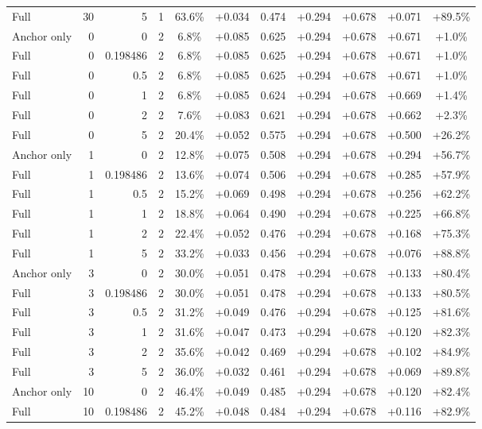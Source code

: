 \begin{table}[htbp]
\begin{tabular}{lrrrccccccc}
Full & 30 & 5 & 1 & 63.6\% & +0.034 & 0.474 & +0.294 & +0.678 & +0.071 & +89.5\% \\
Anchor only & 0 & 0 & 2 & 6.8\% & +0.085 & 0.625 & +0.294 & +0.678 & +0.671 & +1.0\% \\
Full & 0 & 0.198486 & 2 & 6.8\% & +0.085 & 0.625 & +0.294 & +0.678 & +0.671 & +1.0\% \\
Full & 0 & 0.5 & 2 & 6.8\% & +0.085 & 0.625 & +0.294 & +0.678 & +0.671 & +1.0\% \\
Full & 0 & 1 & 2 & 6.8\% & +0.085 & 0.624 & +0.294 & +0.678 & +0.669 & +1.4\% \\
Full & 0 & 2 & 2 & 7.6\% & +0.083 & 0.621 & +0.294 & +0.678 & +0.662 & +2.3\% \\
Full & 0 & 5 & 2 & 20.4\% & +0.052 & 0.575 & +0.294 & +0.678 & +0.500 & +26.2\% \\
Anchor only & 1 & 0 & 2 & 12.8\% & +0.075 & 0.508 & +0.294 & +0.678 & +0.294 & +56.7\% \\
Full & 1 & 0.198486 & 2 & 13.6\% & +0.074 & 0.506 & +0.294 & +0.678 & +0.285 & +57.9\% \\
Full & 1 & 0.5 & 2 & 15.2\% & +0.069 & 0.498 & +0.294 & +0.678 & +0.256 & +62.2\% \\
Full & 1 & 1 & 2 & 18.8\% & +0.064 & 0.490 & +0.294 & +0.678 & +0.225 & +66.8\% \\
Full & 1 & 2 & 2 & 22.4\% & +0.052 & 0.476 & +0.294 & +0.678 & +0.168 & +75.3\% \\
Full & 1 & 5 & 2 & 33.2\% & +0.033 & 0.456 & +0.294 & +0.678 & +0.076 & +88.8\% \\
Anchor only & 3 & 0 & 2 & 30.0\% & +0.051 & 0.478 & +0.294 & +0.678 & +0.133 & +80.4\% \\
Full & 3 & 0.198486 & 2 & 30.0\% & +0.051 & 0.478 & +0.294 & +0.678 & +0.133 & +80.5\% \\
Full & 3 & 0.5 & 2 & 31.2\% & +0.049 & 0.476 & +0.294 & +0.678 & +0.125 & +81.6\% \\
Full & 3 & 1 & 2 & 31.6\% & +0.047 & 0.473 & +0.294 & +0.678 & +0.120 & +82.3\% \\
Full & 3 & 2 & 2 & 35.6\% & +0.042 & 0.469 & +0.294 & +0.678 & +0.102 & +84.9\% \\
Full & 3 & 5 & 2 & 36.0\% & +0.032 & 0.461 & +0.294 & +0.678 & +0.069 & +89.8\% \\
Anchor only & 10 & 0 & 2 & 46.4\% & +0.049 & 0.485 & +0.294 & +0.678 & +0.120 & +82.4\% \\
Full & 10 & 0.198486 & 2 & 45.2\% & +0.048 & 0.484 & +0.294 & +0.678 & +0.116 & +82.9\% \\

\end{tabular}
\end{table}
